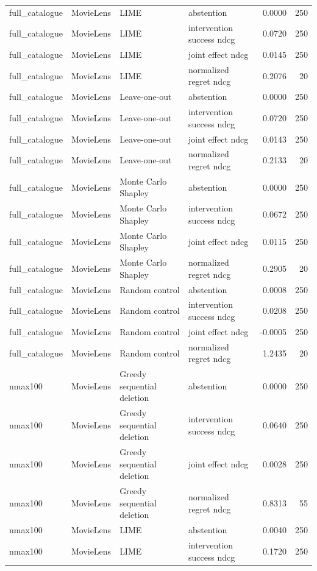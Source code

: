 \begin{longtable}{@{}p{}p{}p{}p{}rr@{}}
full\_catalogue & MovieLens & LIME & abstention & 0.0000 & 250 \\
full\_catalogue & MovieLens & LIME & intervention success ndcg & 0.0720 & 250 \\
full\_catalogue & MovieLens & LIME & joint effect ndcg & 0.0145 & 250 \\
full\_catalogue & MovieLens & LIME & normalized regret ndcg & 0.2076 & 20 \\
full\_catalogue & MovieLens & Leave-one-out & abstention & 0.0000 & 250 \\
full\_catalogue & MovieLens & Leave-one-out & intervention success ndcg & 0.0720 & 250 \\
full\_catalogue & MovieLens & Leave-one-out & joint effect ndcg & 0.0143 & 250 \\
full\_catalogue & MovieLens & Leave-one-out & normalized regret ndcg & 0.2133 & 20 \\
full\_catalogue & MovieLens & Monte Carlo Shapley & abstention & 0.0000 & 250 \\
full\_catalogue & MovieLens & Monte Carlo Shapley & intervention success ndcg & 0.0672 & 250 \\
full\_catalogue & MovieLens & Monte Carlo Shapley & joint effect ndcg & 0.0115 & 250 \\
full\_catalogue & MovieLens & Monte Carlo Shapley & normalized regret ndcg & 0.2905 & 20 \\
full\_catalogue & MovieLens & Random control & abstention & 0.0008 & 250 \\
full\_catalogue & MovieLens & Random control & intervention success ndcg & 0.0208 & 250 \\
full\_catalogue & MovieLens & Random control & joint effect ndcg & -0.0005 & 250 \\
full\_catalogue & MovieLens & Random control & normalized regret ndcg & 1.2435 & 20 \\
nmax100 & MovieLens & Greedy sequential deletion & abstention & 0.0000 & 250 \\
nmax100 & MovieLens & Greedy sequential deletion & intervention success ndcg & 0.0640 & 250 \\
nmax100 & MovieLens & Greedy sequential deletion & joint effect ndcg & 0.0028 & 250 \\
nmax100 & MovieLens & Greedy sequential deletion & normalized regret ndcg & 0.8313 & 55 \\
nmax100 & MovieLens & LIME & abstention & 0.0040 & 250 \\
nmax100 & MovieLens & LIME & intervention success ndcg & 0.1720 & 250 \\

\end{longtable}
